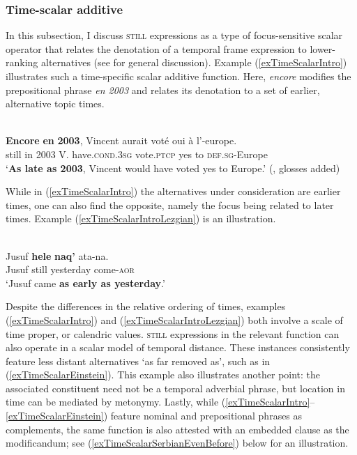 \subsubsection{Time-scalar additive}
\label{sectionTimeScalar}
 In this subsection, I discuss \textsc{still} expressions as a type of focus-sensitive scalar operator that relates the denotation of a temporal frame expression to lower-ranking alternatives (see  for general discussion). Example (\ref{exTimeScalarIntro}) illustrates such a time-specific scalar additive function. Here,  \textit{encore} modifies the prepositional phrase \textit{en 2003} and relates its denotation to a set of earlier, alternative topic times.

\begin{exe}
	\ex\label{exTimeScalarIntro}\\
	 \gll \textbf{Encore} \textbf{en} \textbf{2003}, Vincent aurait voté oui à l'-europe.\\
	still in 2003 V. have.\textsc{cond}.3\textsc{sg} vote.\textsc{ptcp} yes to \textsc{def}.\textsc{sg}-Europe\\
	\glt \lq \textbf{As late as 2003}, Vincent would have voted yes to Europe.' (\cite[160–161]{MosegaardHansen2008}, glosses added)
\end{exe}

While in (\ref{exTimeScalarIntro}) the alternatives under consideration are earlier times, one can also find the opposite, namely the focus being related to later times. Example (\ref{exTimeScalarIntroLezgian}) is an illustration.

\begin{exe}
	\ex {}\label{exTimeScalarIntroLezgian}\\
	\gll Jusuf \textbf{hele} \textbf{naq'} ata-na.\\
	Jusuf still yesterday come-\textsc{aor}\\
	\glt \lq Jusuf came \textbf{as early as yesterday}.' \parencite[85]{Haspelmath1991}
\end{exe}

Despite the differences in the relative ordering of times, examples (\ref{exTimeScalarIntro}) and (\ref{exTimeScalarIntroLezgian}) both involve a scale of time proper, or calendric values. \textsc{still} expressions in the relevant function can also operate in a scalar model of temporal distance. These instances consistently feature less distant alternatives \lq as far removed as\rq{}, such as in (\ref{exTimeScalarEinstein}). This example also illustrates another point: the associated constituent need not be a temporal adverbial phrase, but location in time can be mediated by metonymy. Lastly, while (\ref{exTimeScalarIntro}–\ref{exTimeScalarEinstein}) feature nominal and prepositional phrases as complements, the same function is also attested with an embedded clause as the modificandum; see (\ref{exTimeScalarSerbianEvenBefore}) below for an illustration.

